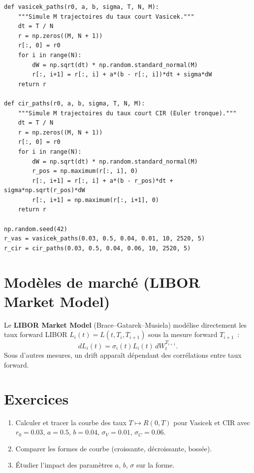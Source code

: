 \begin{codeblock}[title=\textbf{Simulation de trajectoires de taux (Vasicek)}]
\begin{verbatim}
def vasicek_paths(r0, a, b, sigma, T, N, M):
    """Simule M trajectoires du taux court Vasicek."""
    dt = T / N
    r = np.zeros((M, N + 1))
    r[:, 0] = r0
    for i in range(N):
        dW = np.sqrt(dt) * np.random.standard_normal(M)
        r[:, i+1] = r[:, i] + a*(b - r[:, i])*dt + sigma*dW
    return r

def cir_paths(r0, a, b, sigma, T, N, M):
    """Simule M trajectoires du taux court CIR (Euler tronque)."""
    dt = T / N
    r = np.zeros((M, N + 1))
    r[:, 0] = r0
    for i in range(N):
        dW = np.sqrt(dt) * np.random.standard_normal(M)
        r_pos = np.maximum(r[:, i], 0)
        r[:, i+1] = r[:, i] + a*(b - r_pos)*dt + sigma*np.sqrt(r_pos)*dW
        r[:, i+1] = np.maximum(r[:, i+1], 0)
    return r

np.random.seed(42)
r_vas = vasicek_paths(0.03, 0.5, 0.04, 0.01, 10, 2520, 5)
r_cir = cir_paths(0.03, 0.5, 0.04, 0.06, 10, 2520, 5)
\end{verbatim}
\end{codeblock}

\section{Mod\`eles de march\'e (LIBOR Market Model)}

\begin{definition}
Le \textbf{LIBOR Market Model} (Brace--Gatarek--Musiela) mod\'elise
directement les taux forward LIBOR $L_i(t) = L(t, T_i, T_{i+1})$ sous
la mesure forward $T_{i+1}$~:
\[
    dL_i(t) = \sigma_i(t)L_i(t)\,dW_t^{T_{i+1}}.
\]
Sous d'autres mesures, un drift appara\^it d\'ependant des corr\'elations
entre taux forward.
\end{definition}

\section{Exercices}

\begin{exercice}
\begin{enumerate}
    \item Calculer et tracer la courbe des taux $T \mapsto R(0,T)$ pour
          Vasicek et CIR avec $r_0 = 0.03$, $a = 0.5$, $b = 0.04$,
          $\sigma_V = 0.01$, $\sigma_C = 0.06$.
    \item Comparer les formes de courbe (croissante, d\'ecroissante, bos\-s\'ee).
    \item \'Etudier l'impact des param\`etres $a$, $b$, $\sigma$ sur la forme.
\end{enumerate}
\end{exercice}


